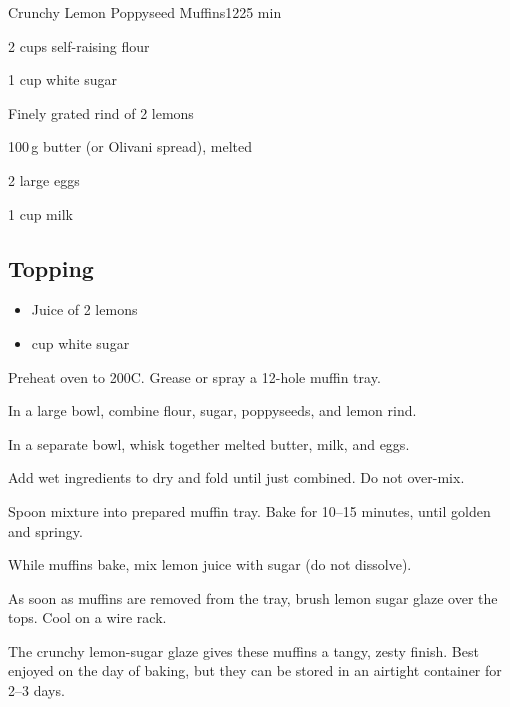 \begin{recipebox}{Crunchy Lemon Poppyseed Muffins}{12}{25 min}
\begin{ingredients}
  \item 2 cups self-raising flour
  \item 1 cup white sugar
  \item Finely grated rind of 2 lemons
  \item 100\,g butter (or Olivani spread), melted
  \item 2 large eggs
  \item 1 cup milk
\end{ingredients}

\subsection*{Topping}
\begin{itemize}[leftmargin=2em]
  \item Juice of 2 lemons
  \item {} cup white sugar
\end{itemize}

\begin{method}
  \item Preheat oven to 200\degree C. Grease or spray a 12-hole muffin tray.
  \item In a large bowl, combine flour, sugar, poppyseeds, and lemon rind.
  \item In a separate bowl, whisk together melted butter, milk, and eggs.
  \item Add wet ingredients to dry and fold until just combined. Do not over-mix.
  \item Spoon mixture into prepared muffin tray. Bake for 10–15 minutes, until golden and springy.
  \item While muffins bake, mix lemon juice with sugar (do not dissolve).
  \item As soon as muffins are removed from the tray, brush lemon sugar glaze over the tops. Cool on a wire rack.
\end{method}

\begin{notes}
The crunchy lemon-sugar glaze gives these muffins a tangy, zesty finish.  
Best enjoyed on the day of baking, but they can be stored in an airtight container for 2–3 days.  
\end{notes}
\end{recipebox}
